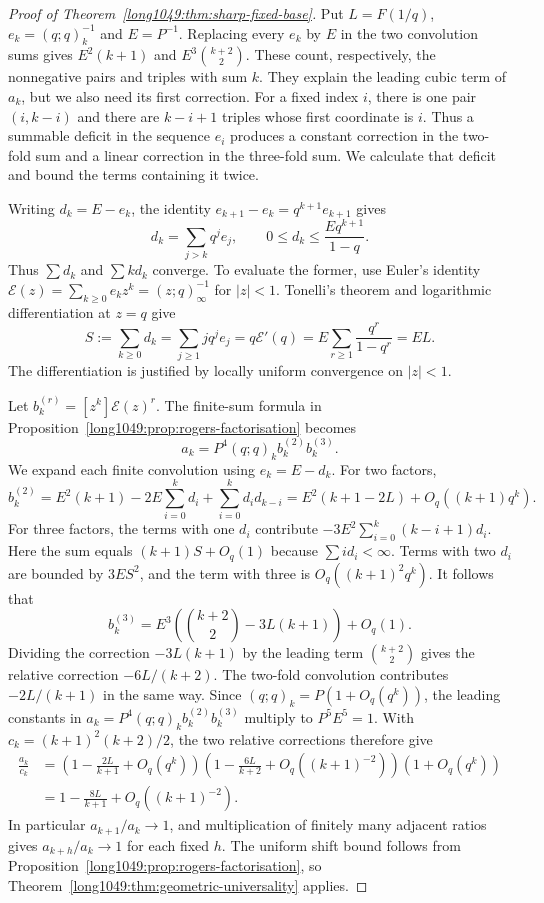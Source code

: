 \documentclass[11pt]{article}
\begin{document}
\begin{proof}[Proof of Theorem~\ref{long1049:thm:sharp-fixed-base}]
Put $L=F(1/q)$, $e_k=(q;q)_k^{-1}$ and $E=P^{-1}$.
Replacing every $e_k$ by $E$ in the two convolution sums gives
$E^2(k+1)$ and $E^3\binom{k+2}{2}$. These count, respectively,
the nonnegative pairs and triples with sum $k$. They explain the
leading cubic term of $a_k$, but we also need its first correction.
For a fixed index $i$, there is one pair $(i,k-i)$ and there are
$k-i+1$ triples whose first coordinate is $i$. Thus a summable
deficit in the sequence $e_i$ produces a constant correction in the
two-fold sum and a linear correction in the three-fold sum.
We calculate that deficit and bound the terms containing it twice.

Writing $d_k=E-e_k$, the identity
$e_{k+1}-e_k=q^{k+1}e_{k+1}$ gives
\[
 d_k=\sum_{j>k}q^je_j,\qquad
 0\le d_k\le\frac{E q^{k+1}}{1-q}.
\]
Thus $\sum d_k$ and $\sum k d_k$ converge. To evaluate the former,
use Euler's identity
$\mathcal E(z)=\sum_{k\ge0}e_kz^k=(z;q)_\infty^{-1}$ for $|z|<1$.
Tonelli's theorem and logarithmic differentiation at $z=q$ give
\[
 S:=\sum_{k\ge0}d_k
 =\sum_{j\ge1}j q^je_j
 =q\mathcal E'(q)
 =E\sum_{r\ge1}\frac{q^r}{1-q^r}=EL.
\]
The differentiation is justified by locally uniform convergence on
$|z|<1$.

Let $b_k^{(r)}=[z^k]\mathcal E(z)^r$. The finite-sum formula in
Proposition~\ref{long1049:prop:rogers-factorisation} becomes
\[
 a_k=P^4(q;q)_k b_k^{(2)}b_k^{(3)}.
\]
We expand each finite convolution using $e_k=E-d_k$. For two factors,
\[
 b_k^{(2)}=E^2(k+1)-2E\sum_{i=0}^k d_i
              +\sum_{i=0}^k d_i d_{k-i}
 =E^2(k+1-2L)+O_q((k+1)q^k).
\]
For three factors, the terms with one $d_i$ contribute
$-3E^2\sum_{i=0}^k(k-i+1)d_i$.
Here the sum equals $(k+1)S+O_q(1)$ because
$\sum i d_i<\infty$. Terms with two $d_i$ are bounded by
$3E S^2$, and the term with three is $O_q((k+1)^2q^k)$.
It follows that
\[
 b_k^{(3)}=E^3\left(\binom{k+2}{2}-3L(k+1)\right)+O_q(1).
\]
Dividing the correction $-3L(k+1)$ by the leading term
$\binom{k+2}{2}$ gives the relative correction $-6L/(k+2)$.
The two-fold convolution contributes $-2L/(k+1)$ in the same way.
Since $(q;q)_k=P(1+O_q(q^k))$, the leading constants in
$a_k=P^4(q;q)_k b_k^{(2)}b_k^{(3)}$ multiply to $P^5E^5=1$.
With $c_k=(k+1)^2(k+2)/2$, the two relative corrections therefore give
\begin{align*}
 \frac{a_k}{c_k}
 &=\left(1-\frac{2L}{k+1}+O_q(q^k)\right)
   \left(1-\frac{6L}{k+2}+O_q((k+1)^{-2})\right)
   \left(1+O_q(q^k)\right)\\
 &=1-\frac{8L}{k+1}+O_q((k+1)^{-2}).
\end{align*}
In particular $a_{k+1}/a_k\to1$, and multiplication of finitely
many adjacent ratios gives $a_{k+h}/a_k\to1$ for each fixed $h$.
The uniform shift bound follows from
Proposition~\ref{long1049:prop:rogers-factorisation}, so
Theorem~\ref{long1049:thm:geometric-universality} applies.


\end{proof}
\end{document}
